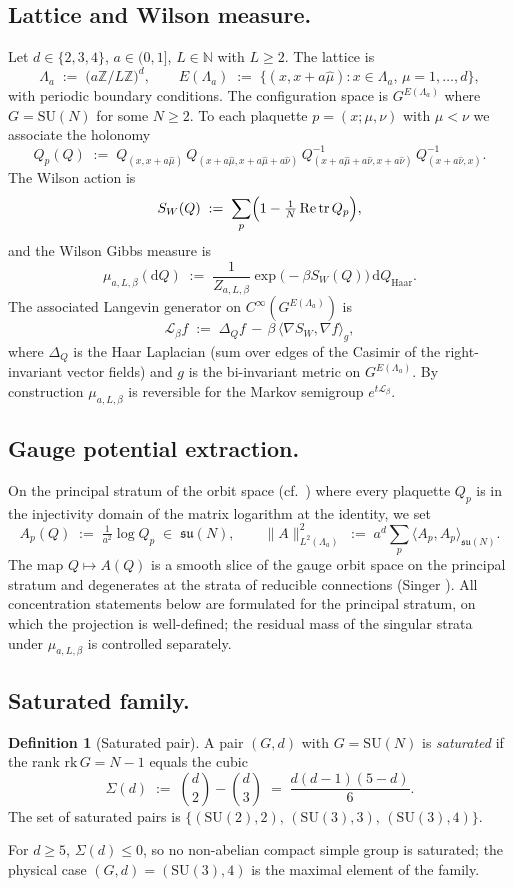 \documentclass[11pt,reqno]{amsart}
\theoremstyle{plain}
\theoremstyle{definition}
\newtheorem{definition}[theorem]{Definition}
\theoremstyle{remark}
\newcommand{\tr}{\operatorname{tr}}
\renewcommand{\Re}{\operatorname{Re}}
\newcommand{\dd}{\mathrm{d}}
\newcommand{\bbZ}{\mathbb{Z}}
\newcommand{\bbN}{\mathbb{N}}
\newcommand{\calL}{\mathcal{L}}
\newcommand{\Lat}{\Lambda}
\newcommand{\sun}{\mathfrak{su}(N)}
\newcommand{\SUN}{\mathrm{SU}(N)}
\begin{document}
\subsection{Lattice and Wilson measure.}
Let $d \in \{2, 3, 4\}$, $a \in (0, 1]$, $L \in \bbN$ with $L \ge 2$. The lattice is
\[
  \Lat_a \;:=\; \bigl( a \bbZ / L \bbZ \bigr)^d, \qquad E(\Lat_a) \;:=\; \bigl\{ (x, x + a\hat\mu) : x \in \Lat_a,\, \mu = 1, \dots, d \bigr\},
\]
with periodic boundary conditions. The configuration space is $G^{E(\Lat_a)}$ where $G = \SUN$ for some $N \ge 2$. To each plaquette $p = (x; \mu, \nu)$ with $\mu < \nu$ we associate the holonomy
\[
  Q_p(Q) \;:=\; Q_{(x, x+a\hat\mu)} \, Q_{(x+a\hat\mu, x+a\hat\mu+a\hat\nu)} \, Q_{(x+a\hat\mu+a\hat\nu, x+a\hat\nu)}^{-1} \, Q_{(x+a\hat\nu, x)}^{-1}.
\]
The Wilson action is
\[
  S_W(Q) \;:=\; \sum_{p} \Bigl( 1 - \tfrac{1}{N} \Re \tr Q_p \Bigr),
\]
and the Wilson Gibbs measure is
\[
  \mu_{a, L, \beta}(\dd Q) \;:=\; \frac{1}{Z_{a, L, \beta}} \exp\!\bigl( - \beta S_W(Q) \bigr) \, \dd Q_{\mathrm{Haar}}.
\]
The associated Langevin generator on $C^\infty(G^{E(\Lat_a)})$ is
\[
  \calL_\beta f \;:=\; \Delta_Q f \,-\, \beta \, \langle \nabla S_W, \nabla f \rangle_g,
\]
where $\Delta_Q$ is the Haar Laplacian (sum over edges of the Casimir of the right-invariant vector fields) and $g$ is the bi-invariant metric on $G^{E(\Lat_a)}$. By construction $\mu_{a, L, \beta}$ is reversible for the Markov semigroup $e^{t \calL_\beta}$.

\subsection{Gauge potential extraction.}
On the principal stratum of the orbit space (cf.\ \cite{RudolphSchmidtVolobuev}) where every plaquette $Q_p$ is in the injectivity domain of the matrix logarithm at the identity, we set
\[
  A_p(Q) \;:=\; \tfrac{1}{a^2} \log Q_p \;\in\; \mathfrak{su}(N), \qquad \|A\|_{L^2(\Lat_a)}^2 \;:=\; a^d \sum_p \langle A_p, A_p \rangle_{\sun}.
\]
The map $Q \mapsto A(Q)$ is a smooth slice of the gauge orbit space on the principal stratum and degenerates at the strata of reducible connections (Singer \cite{Singer1978}). All concentration statements below are formulated for the principal stratum, on which the projection is well-defined; the residual mass of the singular strata under $\mu_{a, L, \beta}$ is controlled separately.

\subsection{Saturated family.}
\begin{definition}[Saturated pair]
\label{def:saturated}
A pair $(G, d)$ with $G = \SUN$ is \emph{saturated} if the rank $\mathrm{rk}\, G = N - 1$ equals the cubic
\[
  \Sigma(d) \;:=\; \binom{d}{2} - \binom{d}{3} \;=\; \frac{d(d-1)(5-d)}{6}.
\]
The set of saturated pairs is $\{(\mathrm{SU}(2), 2),\, (\mathrm{SU}(3), 3),\, (\mathrm{SU}(3), 4)\}$.
\end{definition}
For $d \ge 5$, $\Sigma(d) \le 0$, so no non-abelian compact simple group is saturated; the physical case $(G, d) = (\mathrm{SU}(3), 4)$ is the maximal element of the family.
\end{document}

